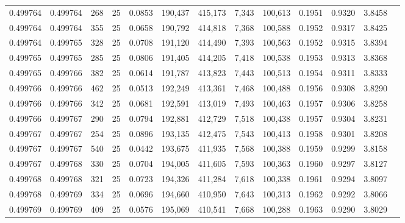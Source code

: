 \begin{tabular}{rrrrrrrrrrrrr}
0.499764 & 0.499764 &   268 &  25 &                                     0.0853 & 190,437 & 415,173 &   7,343 & 100,613 & 0.1951 & 0.9320 & 3.8458 \\
0.499764 & 0.499764 &   355 &  25 &                                     0.0658 & 190,792 & 414,818 &   7,368 & 100,588 & 0.1952 & 0.9317 & 3.8425 \\
0.499764 & 0.499765 &   328 &  25 &                                     0.0708 & 191,120 & 414,490 &   7,393 & 100,563 & 0.1952 & 0.9315 & 3.8394 \\
0.499765 & 0.499765 &   285 &  25 &                                     0.0806 & 191,405 & 414,205 &   7,418 & 100,538 & 0.1953 & 0.9313 & 3.8368 \\
0.499765 & 0.499766 &   382 &  25 &                                     0.0614 & 191,787 & 413,823 &   7,443 & 100,513 & 0.1954 & 0.9311 & 3.8333 \\
0.499766 & 0.499766 &   462 &  25 &                                     0.0513 & 192,249 & 413,361 &   7,468 & 100,488 & 0.1956 & 0.9308 & 3.8290 \\
0.499766 & 0.499766 &   342 &  25 &                                     0.0681 & 192,591 & 413,019 &   7,493 & 100,463 & 0.1957 & 0.9306 & 3.8258 \\
0.499766 & 0.499767 &   290 &  25 &                                     0.0794 & 192,881 & 412,729 &   7,518 & 100,438 & 0.1957 & 0.9304 & 3.8231 \\
0.499767 & 0.499767 &   254 &  25 &                                     0.0896 & 193,135 & 412,475 &   7,543 & 100,413 & 0.1958 & 0.9301 & 3.8208 \\
0.499767 & 0.499767 &   540 &  25 &                                     0.0442 & 193,675 & 411,935 &   7,568 & 100,388 & 0.1959 & 0.9299 & 3.8158 \\
0.499767 & 0.499768 &   330 &  25 &                                     0.0704 & 194,005 & 411,605 &   7,593 & 100,363 & 0.1960 & 0.9297 & 3.8127 \\
0.499768 & 0.499768 &   321 &  25 &                                     0.0723 & 194,326 & 411,284 &   7,618 & 100,338 & 0.1961 & 0.9294 & 3.8097 \\
0.499768 & 0.499769 &   334 &  25 &                                     0.0696 & 194,660 & 410,950 &   7,643 & 100,313 & 0.1962 & 0.9292 & 3.8066 \\
0.499769 & 0.499769 &   409 &  25 &                                     0.0576 & 195,069 & 410,541 &   7,668 & 100,288 & 0.1963 & 0.9290 & 3.8029 \\

\end{tabular}
